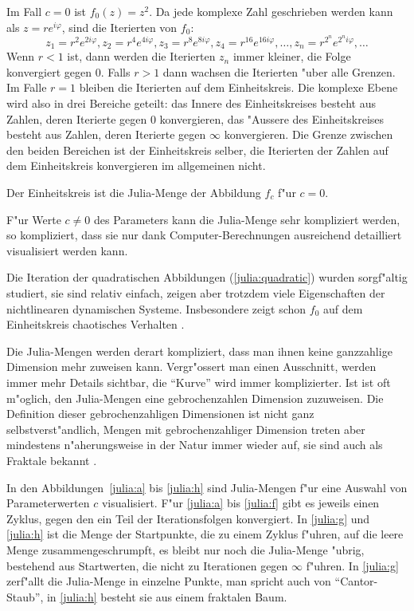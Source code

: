 \begin{refsection}
\begin{beispiel}
Im Fall $c=0$ ist $f_0(z)=z^2$. Da jede komplexe Zahl geschrieben werden
kann als $z=re^{i\varphi}$, sind die Iterierten von $f_0$:
\[
z_1=r^2e^{2i\varphi},
z_2=r^4e^{4i\varphi},
z_3=r^8e^{8i\varphi},
z_4=r^{16}e^{16i\varphi},\dots,
z_n=r^{2^n}e^{2^ni\varphi},\dots
\]
Wenn $r < 1$ ist, dann werden die Iterierten $z_n$ immer kleiner, die
Folge konvergiert gegen $0$.
Falls $r>1$ dann wachsen die Iterierten "uber alle Grenzen.
Im Falle $r=1$ bleiben die Iterierten auf dem Einheitskreis.
Die komplexe Ebene wird also in drei Bereiche geteilt: das
Innere des Einheitskreises besteht aus Zahlen, deren Iterierte gegen
0 konvergieren, das "Aussere des Einheitskreises besteht aus Zahlen,
deren Iterierte gegen $\infty$ konvergieren.
Die Grenze zwischen den beiden Bereichen ist der Einheitskreis selber,
die Iterierten der Zahlen auf dem Einheitskreis konvergieren im
allgemeinen nicht.

Der Einheitskreis ist die Julia-Menge der Abbildung $f_c$ f"ur $c=0$.
\end{beispiel}

F"ur Werte $c\ne 0$ des Parameters kann die Julia-Menge sehr kompliziert
werden, so kompliziert, dass sie nur dank Computer-Berechnungen
ausreichend detailliert visualisiert werden kann.

Die Iteration der quadratischen Abbildungen (\ref{julia:quadratic})
wurden sorgf"altig studiert, sie sind relativ einfach, zeigen aber
trotzdem viele Eigenschaften der nichtlinearen dynamischen Systeme.
Insbesondere zeigt schon $f_0$ auf dem Einheitskreis chaotisches
Verhalten \cite{julia:devaney}.

Die Julia-Mengen werden derart kompliziert, dass man ihnen keine ganzzahlige
Dimension mehr zuweisen kann. Vergr"ossert man einen Ausschnitt, werden
immer mehr Details sichtbar, die ``Kurve'' wird immer komplizierter.
Ist ist oft m"oglich, den Julia-Mengen eine gebrochenzahlen Dimension
zuzuweisen.
Die Definition dieser gebrochenzahligen Dimensionen ist nicht ganz
selbstverst"andlich, Mengen mit gebrochenzahliger Dimension treten
aber mindestens n"aherungsweise in der Natur immer wieder auf, sie
sind auch als Fraktale bekannt \cite{julia:falconer}.

In den Abbildungen~\ref{julia:a} bis \ref{julia:h} sind Julia-Mengen
f"ur eine Auswahl von Parameterwerten $c$ visualisiert.
F"ur \ref{julia:a} bis \ref{julia:f} gibt es jeweils einen Zyklus, gegen
den ein Teil der Iterationsfolgen konvergiert.
In \ref{julia:g} und \ref{julia:h} ist die Menge der Startpunkte, die zu einem
Zyklus f"uhren, auf die leere Menge zusammengeschrumpft, es bleibt nur
noch die Julia-Menge "ubrig, bestehend aus Startwerten, die nicht zu
Iterationen gegen $\infty$ f"uhren.
In \ref{julia:g} zerf"allt die Julia-Menge in einzelne Punkte, 
man spricht auch von ``Cantor-Staub'',
in \ref{julia:h} besteht sie aus einem fraktalen Baum.


\end{refsection}

